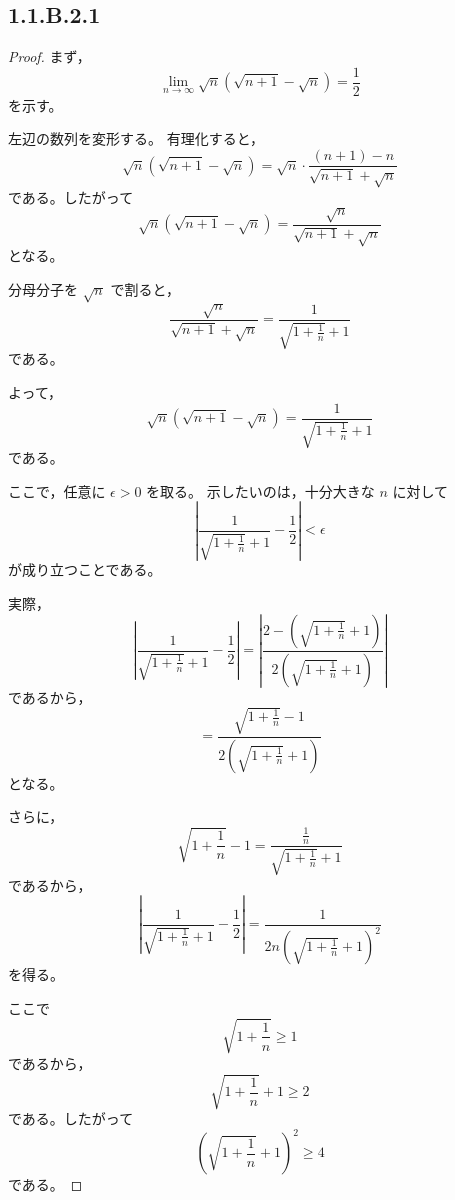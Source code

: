 \subsection{1.1.B.2.1}
\begin{proof}
    まず，
    \[
        \lim_{n\to\infty}
        \sqrt{n}\left(\sqrt{n+1}-\sqrt{n}\right)
        =
        \frac{1}{2}
    \]
    を示す。

    左辺の数列を変形する。
    有理化すると，
    \[
        \sqrt{n}\left(\sqrt{n+1}-\sqrt{n}\right)
        =
        \sqrt{n}\cdot
        \frac{(n+1)-n}{\sqrt{n+1}+\sqrt{n}}
    \]
    である。したがって
    \[
        \sqrt{n}\left(\sqrt{n+1}-\sqrt{n}\right)
        =
        \frac{\sqrt{n}}{\sqrt{n+1}+\sqrt{n}}
    \]
    となる。

    分母分子を $\sqrt{n}$ で割ると，
    \[
        \frac{\sqrt{n}}{\sqrt{n+1}+\sqrt{n}}
        =
        \frac{1}{\sqrt{1+\frac{1}{n}}+1}
    \]
    である。

    よって，
    \[
        \sqrt{n}\left(\sqrt{n+1}-\sqrt{n}\right)
        =
        \frac{1}{\sqrt{1+\frac{1}{n}}+1}
    \]
    である。

    ここで，任意に $\epsilon>0$ を取る。
    示したいのは，十分大きな $n$ に対して
    \[
        \left|
            \frac{1}{\sqrt{1+\frac{1}{n}}+1}
            -
            \frac{1}{2}
        \right|
        <\epsilon
    \]
    が成り立つことである。

    実際，
    \[
        \left|
            \frac{1}{\sqrt{1+\frac{1}{n}}+1}
            -
            \frac{1}{2}
        \right|
        =
        \left|
            \frac{2-\left(\sqrt{1+\frac{1}{n}}+1\right)}
            {2\left(\sqrt{1+\frac{1}{n}}+1\right)}
        \right|
    \]
    であるから，
    \[
        =
        \frac{\sqrt{1+\frac{1}{n}}-1}
        {2\left(\sqrt{1+\frac{1}{n}}+1\right)}
    \]
    となる。

    さらに，
    \[
        \sqrt{1+\frac{1}{n}}-1
        =
        \frac{\frac{1}{n}}{\sqrt{1+\frac{1}{n}}+1}
    \]
    であるから，
    \[
        \left|
            \frac{1}{\sqrt{1+\frac{1}{n}}+1}
            -
            \frac{1}{2}
        \right|
        =
        \frac{1}
        {2n\left(\sqrt{1+\frac{1}{n}}+1\right)^2}
    \]
    を得る。

    ここで
    \[
        \sqrt{1+\frac{1}{n}}\geq 1
    \]
    であるから，
    \[
        \sqrt{1+\frac{1}{n}}+1\geq 2
    \]
    である。したがって
    \[
        \left(\sqrt{1+\frac{1}{n}}+1\right)^2\geq 4
    \]
    である。


\end{proof}
